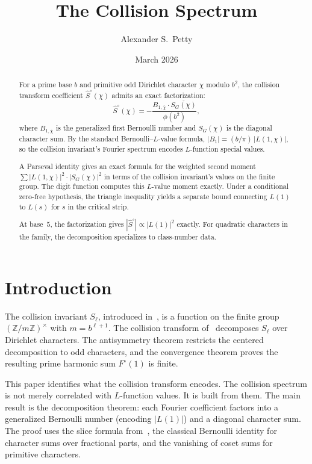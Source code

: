 \documentclass[12pt]{amsart}
\title{The Collision Spectrum}
\author{Alexander S.\ Petty}
\date{March 2026}
\theoremstyle{definition}
\theoremstyle{remark}
\begin{document}
\begin{abstract}
For a prime base $b$ and primitive odd Dirichlet
character $\chi$ modulo $b^2$, the collision
transform coefficient $\hat{S}^{\circ}(\chi)$ admits
an exact factorization:
\[
\hat{S}^{\circ}(\chi)
= -\frac{B_{1,\overline{\chi}} \cdot
\overline{S_G(\chi)}}{\phi(b^2)},
\]
where $B_{1,\overline{\chi}}$ is the generalized
first Bernoulli number and $S_G(\chi)$ is the
diagonal character sum. By the standard Bernoulli--$L$-value
formula, $|B_1| = (b/\pi)\, |L(1, \chi)|$, so the collision
invariant's Fourier spectrum encodes $L$-function
special values.

A Parseval identity gives an exact formula for the
weighted second moment
$\sum |L(1, \chi)|^2 \cdot |S_G(\chi)|^2$
in terms of the collision invariant's values on
the finite group. The digit function computes this
$L$-value moment exactly. Under a conditional zero-free hypothesis, the
triangle inequality yields a separate bound
connecting $L(1)$ to $L(s)$ for $s$ in the
critical strip.

At base~$5$, the factorization gives
$|\hat{S}^{\circ}| \propto |L(1)|^2$ exactly.
For quadratic characters in the family, the
decomposition specializes to class-number data.
\end{abstract}
\maketitle

\section{Introduction}

The collision invariant $S_{\ell}$, introduced
in~\cite{paperA}, is a function on the finite group
$(\mathbb{Z}/m\mathbb{Z})^{\times}$ with
$m = b^{\ell+1}$. The collision transform
of~\cite{paperB} decomposes $S_{\ell}$ over Dirichlet
characters. The antisymmetry theorem restricts the
centered decomposition to odd characters, and the
convergence theorem proves the resulting prime
harmonic sum $F^{\circ}(1)$ is finite.

This paper identifies what the collision transform
encodes. The collision spectrum is not merely
correlated with $L$-function values. It is built
from them. The main result is the decomposition
theorem: each Fourier coefficient factors into a
generalized Bernoulli number (encoding $|L(1)|$)
and a diagonal character sum. The proof uses the
slice formula from~\cite{paperA}, the classical
Bernoulli identity for character sums over fractional
parts, and the vanishing of coset sums for primitive
characters.
\end{document}
